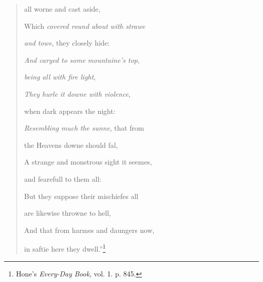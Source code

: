 \documentclass[a4paper, 11pt, oneside, polutonikogreek, english]{article}
\begin{document}
\begin{quotation}
\hspace*{5mm}all worne and cast aside,

Which \emph{covered round about with strawe}

\hspace*{5mm}\emph{and towe}, they closely hide:

\emph{And caryed to some mountaine's top},

\hspace*{5mm}\emph{being all with fire light},

\emph{They hurle it downe with violence},

\hspace*{5mm}when dark appears the night:

\emph{Resembling much the sunne}, that from

\hspace*{5mm}the Heavens downe should fal,

A strange and monstrous sight it seemes,

\hspace*{5mm}and fearefull to them all:

But they suppose their mischiefes all

\hspace*{5mm}are likewise throwne to hell,

And that from harmes and daungers now,

\hspace*{5mm}in saftie here they dwell.''\footnote{Hone's \emph{Every-Day Book}, vol. 1. p. 845.}
\end{quotation}
\end{document}

